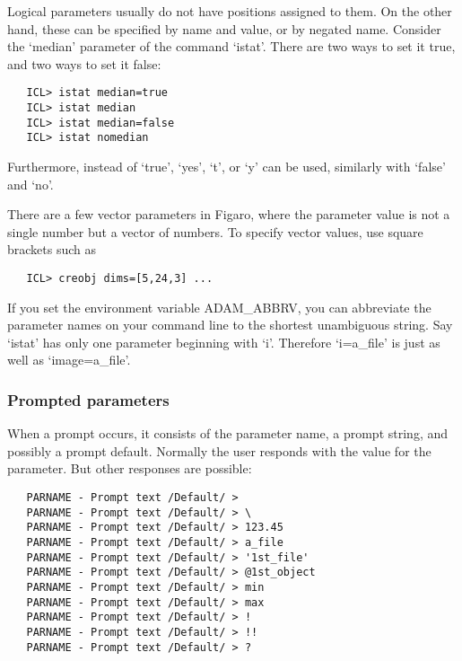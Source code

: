    Logical parameters usually do not have positions assigned to them. On
   the other hand, these can be specified by name and value, or by
   negated name. Consider the `median' parameter of the command
   `istat'. There are two ways to set it true, and two ways to set it
   false:

\begin{verbatim}
   ICL> istat median=true
   ICL> istat median
   ICL> istat median=false
   ICL> istat nomedian
\end{verbatim}

   Furthermore, instead of `true', `yes', `t', or `y' can be
   used, similarly with `false' and `no'.

   There are a few vector parameters in Figaro, where the parameter
   value is not a single number but a vector of numbers. To specify
   vector values, use square brackets such as

\begin{verbatim}
   ICL> creobj dims=[5,24,3] ...
\end{verbatim}

   If you set the environment variable ADAM\_ABBRV, you can abbreviate
   the parameter names on your command line to the shortest unambiguous
   string. Say `istat' has only one parameter beginning with `i'. Therefore
   `i=a\_file' is just as well as `image=a\_file'.


\subsubsection{\label{paramsprompt}Prompted parameters}

   When a prompt occurs, it consists of the parameter name, a prompt
   string, and possibly a prompt default. Normally the user responds
   with the value for the parameter. But other responses are possible:

\begin{verbatim}
   PARNAME - Prompt text /Default/ >
   PARNAME - Prompt text /Default/ > \
   PARNAME - Prompt text /Default/ > 123.45
   PARNAME - Prompt text /Default/ > a_file
   PARNAME - Prompt text /Default/ > '1st_file'
   PARNAME - Prompt text /Default/ > @1st_object
   PARNAME - Prompt text /Default/ > min
   PARNAME - Prompt text /Default/ > max
   PARNAME - Prompt text /Default/ > !
   PARNAME - Prompt text /Default/ > !!
   PARNAME - Prompt text /Default/ > ?
\end{verbatim}

